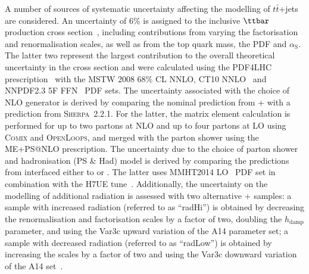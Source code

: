 A number of sources of systematic uncertainty affecting the modelling of $t\bar{t}$+jets are considered. 
An uncertainty of  6\% is assigned to the inclusive $\ttbar$ production
cross section~\cite{Czakon:2011xx}, including contributions from varying the factorisation and renormalisation 
scales, as well as from the top quark mass, the PDF and $\alpha_{\textrm{S}}$. The latter two represent the largest contribution 
to the overall theoretical uncertainty in the cross section and were calculated using the PDF4LHC prescription~\cite{Botje:2011sn} 
with the MSTW 2008 68\% CL NNLO, CT10 NNLO~\cite{Lai:2010vv,Gao:2013xoa} and NNPDF2.3 5F FFN~\cite{Ball:2012cx} PDF sets.
The uncertainty associated with the choice of NLO generator is derived by comparing the nominal prediction from
{\powheg}+{\pythiaeight} with a prediction from \textsc{Sherpa}~2.2.1. For the latter, the matrix element calculation is performed 
for up to two partons at NLO and up to four partons at LO using \textsc{Comix} and \textsc{OpenLoops}, and
merged with the {\sherpa} parton shower using the ME+PS@NLO prescription.
The uncertainty due to the choice of parton shower and hadronisation (PS \& Had) model is derived 
by comparing the predictions from {\powheg} interfaced either to {\pythiaeight} or {}. 
The latter uses MMHT2014 LO~\cite{Harland-Lang:2014zoa} PDF set in combination with the H7UE tune~\cite{Bellm:2015jjp}.
Additionally, the uncertainty on the modelling of additional radiation is assessed with two alternative {\powheg}+{\pythiaeight} samples:
a sample with increased radiation (referred to as ``radHi'') is obtained by decreasing the renormalisation and factorisation scales  
by a factor of two, doubling the $h_{\textrm{damp}}$ parameter, and using the Var3c upward variation of the A14 parameter set;
a sample with decreased radiation (referred to as ``radLow'') is obtained by increasing the scales by a factor of two 
and using the Var3c downward variation of the A14 set~\cite{ATL-PHYS-PUB-2016-004}.

